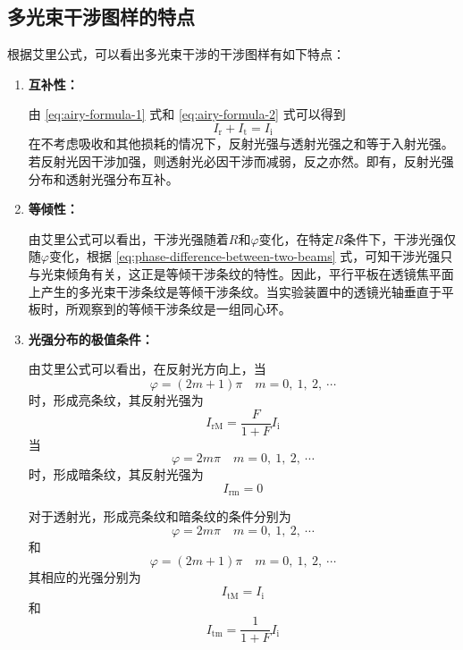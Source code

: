 \documentclass[cn,10pt,chinesefont=founder,math=mtpro2,cite=super,toc=onecol,twoside,openany]{elegantbook}
\begin{document}
\subsection{多光束干涉图样的特点}
根据艾里公式，可以看出多光束干涉的干涉图样有如下特点：
\begin{enumerate}
	\item \textbf{互补性：}
	
	由 \eqref{eq:airy-formula-1} 式和 \eqref{eq:airy-formula-2} 式可以得到
	\begin{equation}
	I_{\mathrm{r}}+I_{\mathrm{t}}=I_{\mathrm{i}}
	\end{equation}
	在不考虑吸收和其他损耗的情况下，反射光强与透射光强之和等于入射光强。若反射光因干涉加强，则透射光必因干涉而减弱，反之亦然。即有，反射光强分布和透射光强分布互补。
	\item \textbf{等倾性：}
	
	由艾里公式可以看出，干涉光强随着$R$和$\varphi$变化，在特定$R$条件下，干涉光强仅随$\varphi$变化，根据 \eqref{eq:phase-difference-between-two-beams} 式，可知干涉光强只与光束倾角有关，这正是等倾干涉条纹的特性。因此，平行平板在透镜焦平面上产生的多光束干涉条纹是等倾干涉条纹。当实验装置中的透镜光轴垂直于平板时，所观察到的等倾干涉条纹是一组同心环。
	\item \textbf{光强分布的极值条件：}
	
	由艾里公式可以看出，在反射光方向上，当
	\begin{equation}
	\varphi=(2m+1)\pi\quad m=0,\ 1,\ 2,\ \cdots
	\end{equation}
	时，形成亮条纹，其反射光强为
	\begin{equation}
	I_{\mathrm{rM}}=\frac{F}{1+F}I_{\mathrm{i}}
	\end{equation}
	当
	\begin{equation}
	\varphi=2m\pi\quad m=0,\ 1,\ 2,\ \cdots
	\end{equation}
	时，形成暗条纹，其反射光强为
	\begin{equation}
	I_{\mathrm{rm}}=0
	\end{equation}
	
	对于透射光，形成亮条纹和暗条纹的条件分别为
	\begin{equation}
	\varphi=2m\pi\quad m=0,\ 1,\ 2,\ \cdots
	\end{equation}
	和
	\begin{equation}
	\varphi=(2m+1)\pi\quad m=0,\ 1,\ 2,\ \cdots
	\end{equation}
	其相应的光强分别为
	\begin{equation}
	I_{\mathrm{tM}}=I_{\mathrm{i}}
	\end{equation}
	和
	\begin{equation}
	I_{\mathrm{tm}}=\frac{1}{1+F}I_{\mathrm{i}}
	\end{equation}
\end{enumerate}
\end{document}
